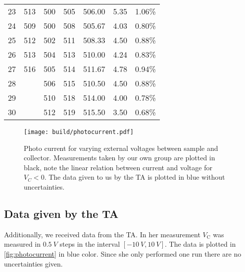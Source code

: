 \begin{table*}
\begin{tabular}{c c c c c c c}
    23&513   &500&505&506.00&5.35&1.06\% \\
    24&509   &500&508&505.67&4.03&0.80\% \\
    25&512   &502&511&508.33&4.50&0.88\% \\
    26&513   &504&513&510.00&4.24&0.83\% \\
    27&516   &505&514&511.67&4.78&0.94\% \\
    28&&506&515&510.50&4.50&0.88\% \\
    29&&510&518&514.00&4.00&0.78\% \\
    30&&512&519&515.50&3.50&0.68\% \\
  \end{tabular}
\end{table*}


\begin{figure*}
  \centering
  \texttt{[image: build/photocurrent.pdf]}
  \caption{Photo current for varying external voltages between sample and collector. Measurements taken by 
  our own group are plotted in black, note the linear relation between current and voltage for
  $V_C<0$. The data given to us by the TA is plotted in blue without uncertainties.}
  \label{fig:photocurrent}
\end{figure*}

\subsection{Data given by the TA}
\label{sec:res:TA_data}
Additionally, we received data from the TA. In her measurement $V_\text{C}$ was measured in
$\SI{0.5}{V}$ steps in the interval $[\SI{-10}{V}, \SI{10}{V}]$. The data is plotted in
\autoref{fig:photocurrent} in blue color. Since she only performed one run there are no uncertainties given.

